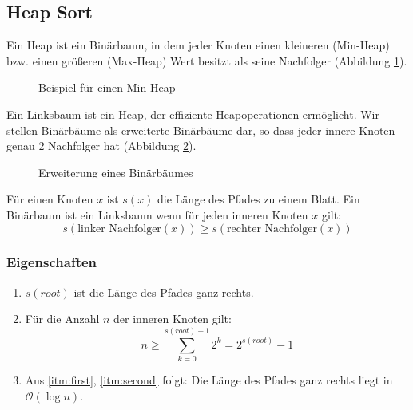 \subsection{Heap Sort}
Ein Heap ist ein Binärbaum, in dem jeder Knoten einen kleineren (Min-Heap) bzw. einen größeren (Max-Heap) Wert besitzt als seine Nachfolger (Abbildung \ref{fig:MinHeap}).
\begin{figure}[htbp]
	\begin{center}
	\end{center}
	\caption{Beispiel für einen Min-Heap}
	\label{fig:MinHeap}
\end{figure}
Ein Linksbaum ist ein Heap, der effiziente Heapoperationen ermöglicht.
Wir stellen Binär\-bäume als erweiterte Binär\-bäume dar, so dass jeder innere Knoten genau 2 Nachfolger hat  (Abbildung \ref{fig:BinaerBaumExtendet}).
\begin{figure}[htbp]
	\begin{center}
		\hspace{1cm}
	\end{center}
	\caption{Erweiterung eines Binärbäumes}
	\label{fig:BinaerBaumExtendet}
\end{figure}
Für einen Knoten \(x\) ist \(s(x)\) die Länge des Pfades zu einem Blatt.
Ein Binärbaum ist ein Linksbaum wenn für jeden inneren Knoten \(x\) gilt:
\[s(\textrm{linker Nachfolger}(x)) \geq s(\textrm{rechter Nachfolger}(x)) \]

\subsubsection{Eigenschaften}
\begin{enumerate}
	\item \label{itm:first} \(s(root)\) ist die Länge des Pfades ganz rechts.
	\item \label{itm:second} Für die Anzahl \(n\) der inneren Knoten  gilt:
		\[ n\geq \sum \limits_{k=0}^{s(root)-1} 2^{k} = 2^{s(root)}-1\]
	\item Aus \ref{itm:first}, \ref{itm:second} folgt: Die Länge des Pfades ganz rechts liegt in \(\mathcal{O}(\log n)\).
\end{enumerate}

